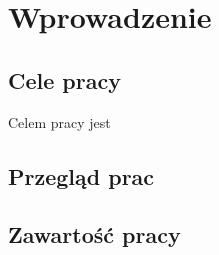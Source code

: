 \chapter{Wprowadzenie}
\label{cha:wprowadzenie}


\section{Cele pracy}
\label{sec:celePracy}

Celem pracy jest 


\section{Przegląd prac}
\label{sec:przegladPrac}


\section{Zawartość pracy}
\label{sec:zawartoscPracy}



















